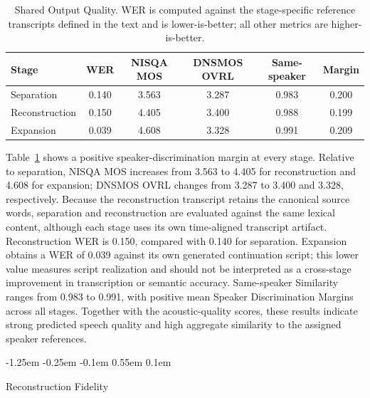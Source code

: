 \documentclass[10pt,twocolumn]{article}
\makeatletter
\renewcommand\subsection{%
  \@startsection{subsection}{2}{\z@}%
    {-1.25em \@plus -0.25em \@minus -0.1em}%
    {0.55em \@plus 0.1em}%
    {\normalfont\fontsize{10.5}{12.5}\selectfont\bfseries\raggedright
     \hyphenpenalty=10000\exhyphenpenalty=10000}}
\makeatother
\begin{document}
\begin{table}[t]
\centering
\caption{Shared Output Quality. WER is computed against the stage-specific reference transcripts defined in the text and is lower-is-better; all other metrics are higher-is-better.}
\label{tab:results}
\small
\begin{tabular}{lccccc}
\toprule
Stage & WER & NISQA MOS & DNSMOS OVRL & Same-speaker & Margin \\
\midrule
Separation & 0.140 & 3.563 & 3.287 & 0.983 & 0.200 \\
Reconstruction & 0.150 & 4.405 & 3.400 & 0.988 & 0.199 \\
Expansion & 0.039 & 4.608 & 3.328 & 0.991 & 0.209 \\
\bottomrule
\end{tabular}
\end{table}

Table~\ref{tab:results} shows a positive speaker-discrimination margin at every stage. Relative to separation, NISQA MOS increases from 3.563 to 4.405 for reconstruction and 4.608 for expansion; DNSMOS OVRL changes from 3.287 to 3.400 and 3.328, respectively. Because the reconstruction transcript retains the canonical source words, separation and reconstruction are evaluated against the same lexical content, although each stage uses its own time-aligned transcript artifact. Reconstruction WER is 0.150, compared with 0.140 for separation. Expansion obtains a WER of 0.039 against its own generated continuation script; this lower value measures script realization and should not be interpreted as a cross-stage improvement in transcription or semantic accuracy. Same-speaker Similarity ranges from 0.983 to 0.991, with positive mean Speaker Discrimination Margins across all stages. Together with the acoustic-quality scores, these results indicate strong predicted speech quality and high aggregate similarity to the assigned speaker references.

\subsection{Reconstruction Fidelity}
\end{document}
